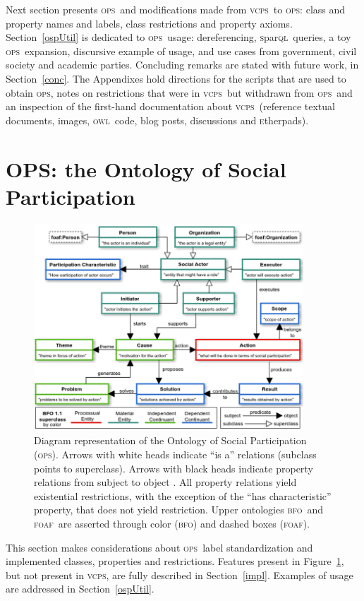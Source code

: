 \documentclass[10pt,letterpaper]{article}
\newcommand{\ops}{\textsc{ops}}
\newcommand{\vcps}{\textsc{vcps}}
\newcommand{\owl}{\textsc{owl}}
\newcommand{\sparql}{\textsc{s}par\textsc{ql}}
\newcommand{\bfo}{\textsc{bfo}}
\newcommand{\foaf}{\textsc{foaf}}
\newcommand{\etherpad}{\textsc{e}therpad}
\begin{document}
Next section presents \ops\ and modifications made from \vcps\ to \ops: class and property names and labels,
class restrictions and property axioms.
Section~\ref{ospUtil} is dedicated to \ops\ usage: dereferencing, \sparql\ queries,
a toy \ops\ expansion, discursive example of usage, and use cases from government,
civil society and academic parties.
Concluding remarks are stated with future work, in Section~\ref{conc}. 
The Appendixes hold directions for the scripts that are used to obtain \ops,
notes on restrictions that were in \vcps\ but withdrawn from \ops\, and an inspection of the first-hand
documentation about \vcps\ (reference textual documents, images, \owl\ code, blog posts, discussions and \etherpad s).

\section{OPS: the Ontology of Social Participation}\label{exp}
\begin{figure}
    \centering
    \includegraphics[width=0.9\textwidth]{figs/opsBFO___}
    \caption{Diagram representation of the Ontology of Social Participation (\ops).
    Arrows with white heads indicate ``is a'' relations (subclass points to superclass).
    Arrows with black heads indicate property relations from subject to object .
    All property relations yield existential restrictions,
    with the exception of the ``has characteristic'' property,
    that does not yield restriction.
    Upper ontologies \bfo\ and \foaf\ are asserted through color (\bfo) and dashed boxes (\foaf).}
    \label{fig:v1}
\end{figure}
This section makes considerations about \ops\ label standardization and implemented classes,
properties and restrictions.
Features present in Figure~\ref{fig:v1}, but not present in \vcps,
are fully described in Section~\ref{impl}.
Examples of usage are addressed in Section~\ref{ospUtil}. 
\end{document}
